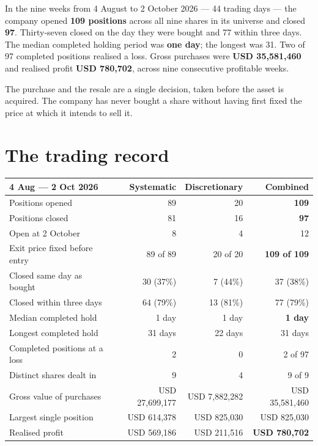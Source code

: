 \documentclass[11pt]{article}
\begin{document}
In the nine weeks from 4 August to 2 October 2026 --- 44 trading days --- the company opened
\textbf{109 positions} across all nine shares in its universe and closed \textbf{97}. Thirty-seven
closed on the day they were bought and 77 within three days. The median completed holding period
was \textbf{one day}; the longest was 31. Two of 97 completed positions realised a loss. Gross
purchases were \textbf{USD 35,581,460} and realised profit \textbf{USD 780,702}, across nine
consecutive profitable weeks.

The purchase and the resale are a single decision, taken before the asset is acquired. The company
has never bought a share without having first fixed the price at which it intends to sell it.

\section{The trading record}

\begin{center}
\footnotesize
\begin{tabular}{@{}l r r r@{}}
\toprule
\textbf{4 Aug --- 2 Oct 2026} & \textbf{Systematic} & \textbf{Discretionary} & \textbf{Combined} \\
\midrule
Positions opened                  & 89 & 20 & \textbf{109} \\
Positions closed                  & 81 & 16 & \textbf{97} \\
Open at 2 October                 &  8 &  4 & 12 \\
Exit price fixed before entry     & 89 of 89 & 20 of 20 & \textbf{109 of 109} \\
Closed same day as bought         & 30 (37\%) & 7 (44\%) & 37 (38\%) \\
Closed within three days          & 64 (79\%) & 13 (81\%) & 77 (79\%) \\
Median completed hold             & 1 day & 1 day & \textbf{1 day} \\
Longest completed hold            & 31 days & 22 days & 31 days \\
Completed positions at a loss     & 2 & 0 & 2 of 97 \\
Distinct shares dealt in          & 9 & 4 & 9 of 9 \\
Gross value of purchases          & USD 27,699,177 & USD 7,882,282 & USD 35,581,460 \\
Largest single position           & USD 614,378 & USD 825,030 & USD 825,030 \\
Realised profit                   & USD 569,186 & USD 211,516 & \textbf{USD 780,702} \\
\bottomrule
\end{tabular}
\end{center}
\end{document}
